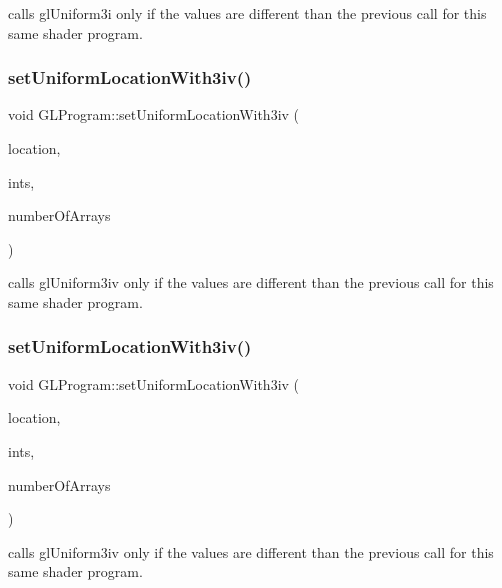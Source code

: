 calls gl\+Uniform3i only if the values are different than the previous call for this same shader program. \mbox{\label{classGLProgram_a2fb342d0da47da38ec70fd670af18fe4}} 
\subsubsection{\texorpdfstring{set\+Uniform\+Location\+With3iv()}{setUniformLocationWith3iv()}\hspace{0.1cm}{\footnotesize\ttfamily [1/2]}}
{\footnotesize\ttfamily void G\+L\+Program\+::set\+Uniform\+Location\+With3iv (\begin{DoxyParamCaption}\item[{G\+Lint}]{location,  }\item[{G\+Lint $\ast$}]{ints,  }\item[{unsigned int}]{number\+Of\+Arrays }\end{DoxyParamCaption})}

calls gl\+Uniform3iv only if the values are different than the previous call for this same shader program. \mbox{\label{classGLProgram_a2fb342d0da47da38ec70fd670af18fe4}} 
\subsubsection{\texorpdfstring{set\+Uniform\+Location\+With3iv()}{setUniformLocationWith3iv()}\hspace{0.1cm}{\footnotesize\ttfamily [2/2]}}
{\footnotesize\ttfamily void G\+L\+Program\+::set\+Uniform\+Location\+With3iv (\begin{DoxyParamCaption}\item[{G\+Lint}]{location,  }\item[{G\+Lint $\ast$}]{ints,  }\item[{unsigned int}]{number\+Of\+Arrays }\end{DoxyParamCaption})}

calls gl\+Uniform3iv only if the values are different than the previous call for this same shader program. \mbox{\label{classGLProgram_aae6350415e7f86969daa6de160859cf3}} 
